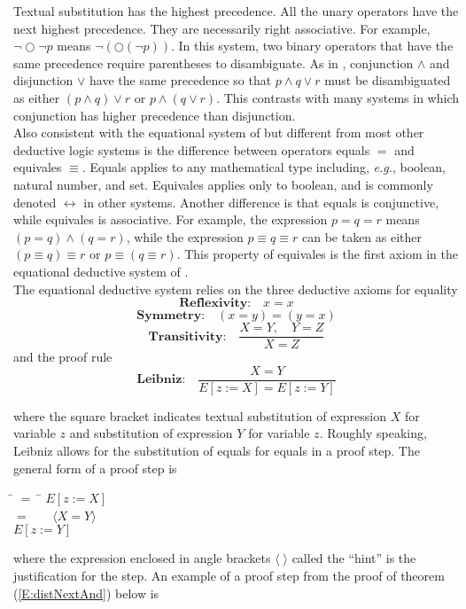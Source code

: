 \documentclass[fleqn, leqno]{article}
\newcommand{\lgap}{2pt}                             %
\newcommand{\mymathindent}{24pt}                    %
\newcommand{\Next}{\bigcirc}
\newcommand{\Gll} {\langle}                         %
\newcommand{\Ggg} {\rangle}                         %
\newcommand{\Hint}[1]     {\ \ \ $\Gll              \mbox{#1} \Ggg$ }   %
\begin{document}
Textual substitution has the highest precedence.
All the unary operators have the next highest precedence.
They are necessarily right associative.
For example, $\lnot \Next \lnot p$ means $\lnot (\Next (\lnot p))$.
In this system, two binary operators that have the same precedence require parentheses to disambiguate.
As in \cite{LADM}, conjunction $\land$ and disjunction $\lor$ have the same precedence so that $p\land q\lor r$
must be disambiguated as either $(p\land q)\lor r$ or $p\land (q\lor r)$.
This contrasts with many systems in which conjunction has higher precedence than disjunction.\\

Also consistent with the equational system of \cite{LADM} but different from most other deductive logic systems
is the difference between operators equals $=$ and equivales $\equiv$.
Equals applies to any mathematical type including, {\itshape e.g.\/}, boolean, natural number, and set.
Equivales applies only to boolean, and is commonly denoted $\leftrightarrow$ in other systems.
Another difference is that equals is conjunctive, while equivales is associative.
For example, the expression $p = q = r$ means $(p = q) \land (q = r)$, while the expression $p \equiv q \equiv r$
can be taken as either $(p \equiv q) \equiv r$ or $p \equiv (q \equiv r)$.
This property of equivales is the first axiom in the equational deductive system of \cite{LADM}.
\\

The equational deductive system relies on the three deductive axioms for equality
\[
\textbf{Reflexivity:}\quad x=x
\]
\[
\textbf{Symmetry:}\quad (x=y) = (y=x)
\]
\[
\textbf{Transitivity:}\quad \frac{X=Y, \quad Y=Z}{X=Z}
\]
and the proof rule
\[
\textbf{Leibniz:}\quad \frac{X=Y}{E[z:=X]=E[z:=Y]}
\]

where the square bracket indicates textual substitution of expression $X$ for variable $z$ and substitution
of expression $Y$ for variable $z$.
Roughly speaking, Leibniz allows for the substitution of equals for equals in a proof step.
The general form of a proof step is

\begin{tabbing}
\hspace{\mymathindent} \= $= \;$ \=  \kill
  \> \>   $E[z:=X]$\\[\lgap]
  \> $=$  \>  \Hint{$X=Y$} \\[\lgap]
  \> \>   $E[z:=Y]$
\end{tabbing}

where the expression enclosed in angle brackets $\Gll\;\Ggg$ called the ``hint'' is the justification for the step.
An example of a proof step from the proof of theorem (\ref{E:distNextAnd}) below is
\end{document}
